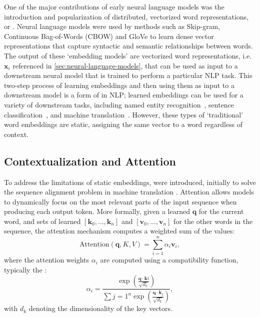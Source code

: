 One of the major contributions of early neural language models was the introduction and popularization of distributed, vectorized word representations, or . Neural language models were used by methods such as Skip-gram, Continuous Bag-of-Words (CBOW) \citep{mikolov2013efficient, mikolov2013distributed} and GloVe \citep{pennington2014glove} to learn dense vector representations that capture syntactic and semantic relationships between words. The output of these `embedding models' are vectorized word representations, i.e. $\mathbf{x}_i$ referenced in \ref{sec:neural-language-models}, that can be used as input to a downstream neural model that is trained to perform a particular NLP task. This two-step process of learning embeddings and then using them as input to a downstream model is a form of  in NLP; learned embeddings can be used for a variety of downstream tasks, including named entity recognition~\citep{lample2016neural}, sentence classification~\citep{kim2014convolutional}, and machine translation~\citep{qi2018translation}. However, these types of `traditional' word embeddings are static, assigning the same vector to a word regardless of context.


\subsection{Contextualization and Attention}
To address the limitations of static embeddings,  were introduced, initially to solve the sequence alignment problem in machine translation \citep{bahdanau2015neural,luong2015effective}. Attention allows models to dynamically focus on the most relevant parts of the input sequence when producing each output token. More formally, given a learned  $\mathbf{q}$ for the current word, and sets of learned  $[\mathbf{k}_0, \ldots, \mathbf{k}_n]$ and  $[\mathbf{v}_0, \ldots, \mathbf{v}_n]$ for the other words in the sequence, the attention mechanism computes a weighted sum of the values:
\begin{equation}
\text{Attention}(\mathbf{q}, K, V) = \sum_{i=1}^{n} \alpha_i \mathbf{v}_i,
\end{equation}
where the attention weights $\alpha_i$ are computed using a compatibility function, typically the :
\begin{equation}
\alpha_i = \frac{\exp\left(\frac{\mathbf{q} \cdot \mathbf{k}i}{\sqrt{d_k}}\right)}{\sum{j=1}^{n} \exp\left(\frac{\mathbf{q} \cdot \mathbf{k}_j}{\sqrt{d_k}}\right)},
\end{equation}
with $d_k$ denoting the dimensionality of the key vectors. 

